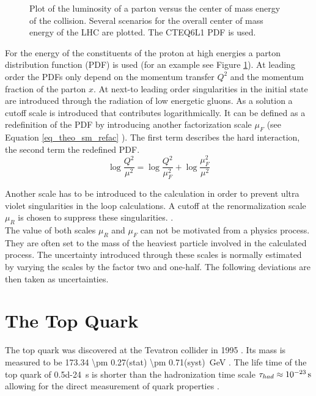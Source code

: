 \begin{figure}[ht]
  \caption{Plot of the luminosity of a parton versus the center of mass energy of the collision. Several scenarios for the overall center of mass energy of the LHC are plotted. The CTEQ6L1 PDF is used. \cite{Quigg:2009gg} \cite{Pumplin:2002vw}}
  \label{fig_theo_pdf}
\end{figure}

For the energy of the constituents of the proton at high energies a parton distribution function (PDF) is used (for an example see Figure \ref{fig_theo_pdf}). At leading order the PDFs only depend on the momentum transfer $Q^2$ and the momentum fraction of the parton $x$. At next-to leading order singularities in the initial state are introduced through the radiation of low energetic gluons. As a solution a cutoff scale is introduced that contributes logarithmically. It can be defined as a redefinition of the PDF by introducing another factorization scale $\mu_F$ (see Equation \ref{eq_theo_sm_refac} \cite{tholen:ma} \cite{ubiali_phd}). The first term describes the hard interaction, the second term the redefined PDF.\\

\begin{equation}
\log \frac{Q^2}{\mu^2} = \log \frac{Q^2}{\mu^2_F} + \log \frac{\mu^2_F}{\mu^2}
\label{eq_theo_sm_refac}
\end{equation}

Another scale has to be introduced to the calculation in order to prevent ultra violet singularities in the loop calculations. A cutoff at the renormalization scale $\mu_R$ is chosen to suppress these singularities. \cite{'tHooft:880603}. \\
The value of both scales $\mu_R$ and $\mu_F$ can not be motivated from a physics process. They are often set to the mass of the heaviest particle involved in the calculated process. The uncertainty introduced through these scales is normally estimated by varying the scales by the factor two and one-half. The following deviations are then taken as uncertainties.

\section{The Top Quark}

The top quark was discovered at the Tevatron collider in 1995 \cite{Abe:1995hr} \cite{Abachi:1995iq}. Its mass is measured to be \SI[parse-numbers=false]{173.34 \pm 0.27(stat) \pm 0.71(syst)}{\giga \electronvolt} \cite{arXiv:1403.4427}. The life time of the top quark of \SI{0.5d-24}{\second} is shorter than the hadronization time scale $\tau_{had} \approx \SI{d-23}{\second}$ allowing for the direct measurement of quark properties \cite{toppdg}.

